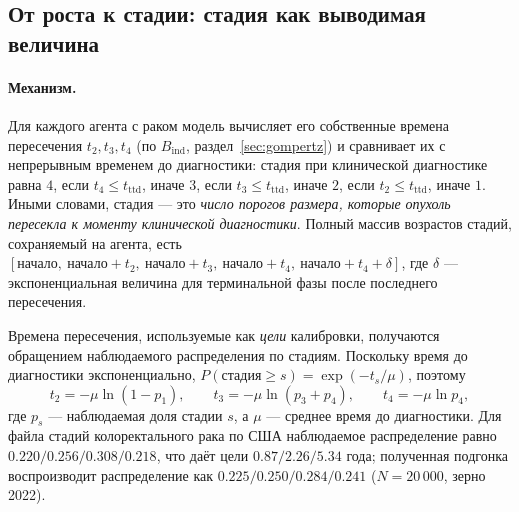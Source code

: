 \documentclass[12pt,a4paper]{article}
\newcommand{\mech}[1]{\paragraph{Механизм.} #1}
\begin{document}
\subsection{От роста к стадии: стадия как выводимая величина}
\label{sec:stage}

\mech{Для каждого агента с раком модель вычисляет его собственные времена пересечения $t_2, t_3, t_4$ (по
$B_{\text{ind}}$, раздел~\ref{sec:gompertz}) и сравнивает их с непрерывным временем до диагностики: стадия
при клинической диагностике равна $4$, если $t_4 \le t_{\text{ttd}}$, иначе $3$, если
$t_3 \le t_{\text{ttd}}$, иначе $2$, если $t_2 \le t_{\text{ttd}}$, иначе $1$. Иными словами, стадия ---
это \emph{число порогов размера, которые опухоль пересекла к моменту клинической диагностики}. Полный массив
возрастов стадий, сохраняемый на агента, есть
$[\text{начало},\ \text{начало}+t_2,\ \text{начало}+t_3,\ \text{начало}+t_4,\ \text{начало}+t_4+\delta]$,
где $\delta$ --- экспоненциальная величина для терминальной фазы после последнего пересечения.

Времена пересечения, используемые как \emph{цели} калибровки, получаются обращением наблюдаемого
распределения по стадиям. Поскольку время до диагностики экспоненциально,
$P(\text{стадия} \ge s) = \exp(-t_s/\mu)$, поэтому
\[
t_2 = -\mu \ln(1 - p_1), \qquad t_3 = -\mu \ln(p_3 + p_4), \qquad t_4 = -\mu \ln p_4 ,
\]
где $p_s$ --- наблюдаемая доля стадии $s$, а $\mu$ --- среднее время до диагностики. Для файла стадий
колоректального рака по США наблюдаемое распределение равно $0.220/0.256/0.308/0.218$, что даёт цели
$0.87/2.26/5.34$ года; полученная подгонка воспроизводит распределение как
$0.225/0.250/0.284/0.241$ ($N = 20\,000$, зерно 2022).}
\end{document}
